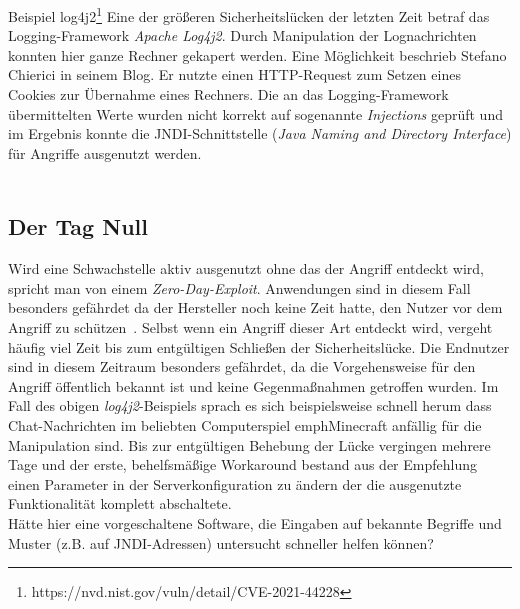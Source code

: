 \textcolor{bhtGray}{ Beispiel log4j2\footnote{https://nvd.nist.gov/vuln/detail/CVE-2021-44228}} Eine der größeren Sicherheitslücken der letzten Zeit betraf das Logging-Framework \emph{Apache Log4j2}. Durch Manipulation der Lognachrichten konnten hier ganze Rechner gekapert werden. Eine Möglichkeit beschrieb Stefano Chierici in seinem Blog\cite{chierici2021}. Er nutzte einen HTTP-Request zum Setzen eines Cookies zur Übernahme eines Rechners. Die an das Logging-Framework übermittelten Werte wurden nicht korrekt auf sogenannte \emph{Injections} geprüft und im Ergebnis konnte die JNDI-Schnittstelle (\emph{Java Naming and Directory Interface}) für Angriffe ausgenutzt werden. \\\\


\subsection{Der Tag Null}

Wird eine Schwachstelle aktiv ausgenutzt ohne das der Angriff entdeckt wird, spricht man von einem \glqq\emph{Zero-Day-Exploit}\grqq. Anwendungen sind in diesem Fall besonders gefährdet da der Hersteller noch keine Zeit hatte, den Nutzer vor dem Angriff zu schützen~\cite{bsi0day}. Selbst wenn ein Angriff dieser Art entdeckt wird, vergeht häufig viel Zeit bis zum entgültigen Schließen der Sicherheitslücke. Die Endnutzer sind in diesem Zeitraum besonders gefährdet, da die Vorgehensweise für den Angriff öffentlich bekannt ist und keine Gegenmaßnahmen getroffen wurden. Im Fall des obigen \emph{log4j2}-Beispiels sprach es sich beispielsweise schnell herum dass Chat-Nachrichten im beliebten Computerspiel emph{Minecraft} anfällig für die Manipulation sind. Bis zur entgültigen Behebung der Lücke vergingen mehrere Tage und der erste, behelfsmäßige Workaround bestand aus der Empfehlung einen Parameter in der Serverkonfiguration zu ändern der die ausgenutzte Funktionalität komplett abschaltete.\\ Hätte hier eine vorgeschaltene Software, die Eingaben auf bekannte Begriffe und Muster (z.B. auf JNDI-Adressen) untersucht schneller helfen können?


